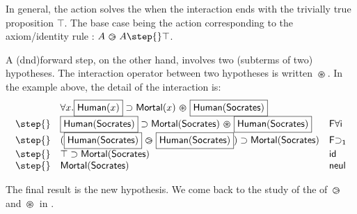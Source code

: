 In general, the action solves the  when the interaction ends with
the trivially true proposition $\top$. The base case being the action
corresponding to the axiom/identity rule : $A\back A \step{} \top$.

A \kl(dnd){forward} step, on the other hand, involves two (subterms of two)
hypotheses. The interaction operator between two hypotheses is written
$\operatorname{\,\varoast\,}$. In the example above, the detail of the interaction is:
$$
  \begin{array}{lll}
    &  \forall x .\select{\human(x)}\limp\mortal(x) \forw \select{\human(\socrates)}&\\
    \step{} & \select{\human(\socrates)}\limp\mortal(\socrates) \forw \select{\human(\socrates)}& \mathsf{F \forall i}\\
    \step{} & (\select{\human(\socrates)}\back \select{\human(\socrates)} )\limp\mortal(\socrates) &\mathsf{F{\limp}_1}\\
    \step{} & \top \limp\mortal(\socrates) &\mathsf{id}\\
    \step{} & \mortal(\socrates) & \mathsf{neul}\\
  \end{array}
$$

The final result is the new hypothesis. We come back to the study of the  of ${\operatorname{\,\varogreaterthan\,}}$ and ${\operatorname{\,\varoast\,}}$ in .


